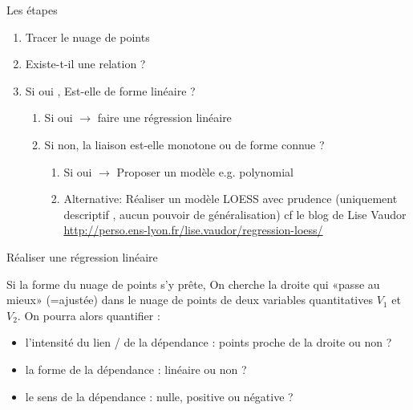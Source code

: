 \documentclass{beamer}
\begin{document}
\begin{frame}{Les étapes}

\begin{enumerate}
  \item Tracer le nuage de points
  \item Existe-t-il une relation ? 
  \item Si oui , Est-elle de forme linéaire ? 
  \begin{enumerate}
  \item Si oui  $\rightarrow$ faire une \alert{régression linéaire} 
   \item Si non, la liaison est-elle monotone ou de forme connue ?
   \begin{enumerate}
   \item Si oui $\rightarrow$  Proposer un \alert{modèle} e.g. polynomial
   \item Alternative: Réaliser un modèle \alert{LOESS} avec prudence (uniquement descriptif , aucun pouvoir de généralisation) cf le blog de Lise Vaudor \url{http://perso.ens-lyon.fr/lise.vaudor/regression-loess/}
\end{enumerate}
\end{enumerate}
\end{enumerate}


\end{frame}



\begin{frame}[fragile]{Réaliser une régression linéaire}



Si la forme du nuage de points s'y prête,  On cherche la droite qui «passe au mieux» (=\alert{ajustée}) dans le nuage de points de deux variables quantitatives $V_1$ et $V_2$. On pourra alors quantifier : 

\begin{itemize}
\item l'\alert{intensité} du lien / de la dépendance  : points proche de la droite ou non ?
\item la \alert{forme} de la dépendance : linéaire ou non ?
\item le \alert{sens} de la dépendance  : nulle, positive ou négative ?
\end{itemize}

\end{frame}
\end{document}
